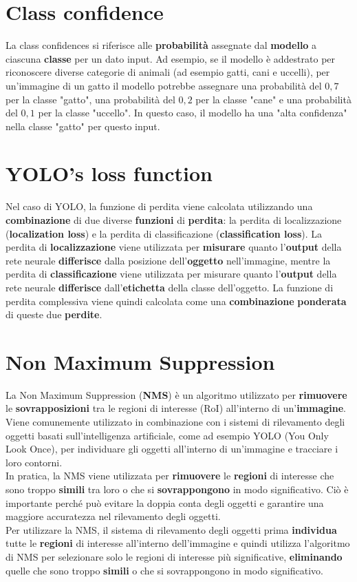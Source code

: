\documentclass{article}
\begin{document}
\section{Class confidence}
La class confidences si riferisce alle \textbf{probabilità} assegnate dal \textbf{modello} a ciascuna \textbf{classe} per un dato input. Ad esempio, se il modello è addestrato per riconoscere diverse categorie di animali (ad esempio gatti, cani e uccelli), per un'immagine di un gatto il modello potrebbe assegnare una probabilità del $0,7$ per la classe "gatto", una probabilità del $0,2$ per la classe "cane" e una probabilità del $0,1$ per la classe "uccello". In questo caso, il modello ha una "alta confidenza" nella classe "gatto" per questo input.

\section{YOLO’s loss function}
Nel caso di YOLO, la funzione di perdita viene calcolata utilizzando una \textbf{combinazione} di due diverse \textbf{funzioni} di \textbf{perdita}: la perdita di localizzazione (\textbf{localization loss}) e la perdita di classificazione (\textbf{classification loss}). La perdita di \textbf{localizzazione} viene utilizzata per \textbf{misurare} quanto l'\textbf{output} della rete neurale \textbf{differisce} dalla posizione dell'\textbf{oggetto} nell'immagine, mentre la perdita di \textbf{classificazione} viene utilizzata per misurare quanto l'\textbf{output} della rete neurale \textbf{differisce} dall'\textbf{etichetta} della classe dell'oggetto. La funzione di perdita complessiva viene quindi calcolata come una \textbf{combinazione} \textbf{ponderata} di queste due \textbf{perdite}.

\section{Non Maximum Suppression}
La Non Maximum Suppression (\textbf{NMS}) è un algoritmo utilizzato per \textbf{rimuovere} le \textbf{sovrapposizioni} tra le regioni di interesse (RoI) all'interno di un'\textbf{immagine}. Viene comunemente utilizzato in combinazione con i sistemi di rilevamento degli oggetti basati sull'intelligenza artificiale, come ad esempio YOLO (You Only Look Once), per individuare gli oggetti all'interno di un'immagine e tracciare i loro contorni.
\\
In pratica, la NMS viene utilizzata per \textbf{rimuovere} le \textbf{regioni} di interesse che sono troppo \textbf{simili} tra loro o che si \textbf{sovrappongono} in modo significativo. Ciò è importante perché può evitare la doppia conta degli oggetti e garantire una maggiore accuratezza nel rilevamento degli oggetti.
\\
Per utilizzare la NMS, il sistema di rilevamento degli oggetti prima \textbf{individua} tutte le \textbf{regioni} di interesse all'interno dell'immagine e quindi utilizza l'algoritmo di NMS per selezionare solo le regioni di interesse più significative, \textbf{eliminando} quelle che sono troppo \textbf{simili} o che si sovrappongono in modo significativo.
\end{document}
